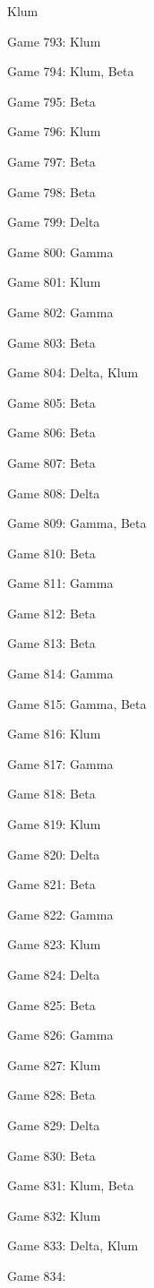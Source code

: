 \documentclass{article}
\begin{document}
\begin{multicols}{3}
\begin{compactitem}
Klum
\item Game 793:
Klum
\item Game 794:
Klum, Beta
\item Game 795:
Beta
\item Game 796:
Klum
\item Game 797:
Beta
\item Game 798:
Beta
\item Game 799:
Delta
\item Game 800:
Gamma
\item Game 801:
Klum
\item Game 802:
Gamma
\item Game 803:
Beta
\item Game 804:
Delta, Klum
\item Game 805:
Beta
\item Game 806:
Beta
\item Game 807:
Beta
\item Game 808:
Delta
\item Game 809:
Gamma, Beta
\item Game 810:
Beta
\item Game 811:
Gamma
\item Game 812:
Beta
\item Game 813:
Beta
\item Game 814:
Gamma
\item Game 815:
Gamma, Beta
\item Game 816:
Klum
\item Game 817:
Gamma
\item Game 818:
Beta
\item Game 819:
Klum
\item Game 820:
Delta
\item Game 821:
Beta
\item Game 822:
Gamma
\item Game 823:
Klum
\item Game 824:
Delta
\item Game 825:
Beta
\item Game 826:
Gamma
\item Game 827:
Klum
\item Game 828:
Beta
\item Game 829:
Delta
\item Game 830:
Beta
\item Game 831:
Klum, Beta
\item Game 832:
Klum
\item Game 833:
Delta, Klum
\item Game 834:

\end{compactitem}
\end{multicols}
\end{document}
